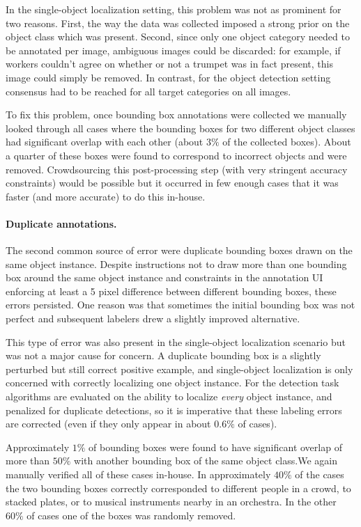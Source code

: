\begin{appendices}
In the single-object localization
setting, this problem was not as prominent for two reasons. First, the way the data was collected imposed a strong prior on the object class which was present.
Second, since only one object category needed to be annotated per image, ambiguous images could be discarded: for example, if workers couldn't agree on whether or not a trumpet was in fact present, this image could simply
be removed. In contrast, for the object detection setting
consensus had to be reached for all target categories on all images. 

To fix this problem, once bounding box annotations were collected we manually looked through all cases where the bounding
boxes for two different object classes had significant overlap with each other (about $3\%$ of the collected boxes). 
About a quarter of these boxes were found to correspond to incorrect objects and were removed.
Crowdsourcing this post-processing step (with very stringent accuracy constraints) would
be possible but it occurred in few enough cases that it was faster (and more accurate) to do this in-house.

\paragraph{Duplicate annotations.} The second common source of error were duplicate bounding boxes drawn
on the same object instance. Despite instructions not to draw more than one bounding box around the same object instance
and constraints in the annotation UI enforcing at least a 5 pixel difference between different bounding boxes,
these errors persisted. One reason was that sometimes  the initial bounding box was not
perfect and subsequent labelers drew a slightly improved alternative.

This type of error was also present in the single-object localization scenario but was not a major cause for concern. 
A duplicate bounding box is a slightly perturbed but still correct positive example, and single-object localization is only
concerned with correctly localizing one object instance. For the detection task algorithms are evaluated on the ability to localize
\emph{every} object instance, and penalized for duplicate detections, so it is imperative that these labeling errors
are corrected (even if they only appear in about $0.6\%$ of cases).

Approximately $1\%$ of bounding boxes were found to have significant overlap of more than $50\%$ with another
bounding box of the same object class.We again manually verified all of these cases in-house.  In approximately $40\%$ of the cases the two bounding boxes correctly
corresponded to different people in a crowd, to stacked plates, or to musical instruments nearby in an orchestra.
In the other $60\%$ of cases one of the boxes was randomly removed. 


\end{appendices}
